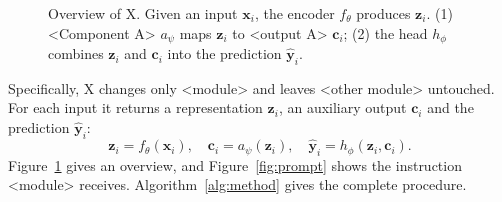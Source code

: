 \begin{figure}[t]
    \centering
    \begin{minipage}{0.9\textwidth}
    \end{minipage}
    \caption{Overview of X. Given an input $\mathbf{x}_{i}$, the encoder $f_\theta$ produces $\mathbf{z}_{i}$. (1) <Component A> $a_\psi$ maps $\mathbf{z}_{i}$ to <output A> $\mathbf{c}_{i}$; (2) the head $h_\phi$ combines $\mathbf{z}_{i}$ and $\mathbf{c}_{i}$ into the prediction $\hat{\mathbf{y}}_{i}$.}
    \label{fig:main-figure}
    \vspace{-6pt}
\end{figure}

Specifically, X changes only <module> and leaves <other module> untouched.
For each input it returns a representation $\mathbf{z}_{i}$, an auxiliary output $\mathbf{c}_{i}$ and the prediction $\hat{\mathbf{y}}_{i}$:
\begin{equation}
\mathbf{z}_{i} = f_\theta(\mathbf{x}_{i}), \quad \mathbf{c}_{i} = a_\psi(\mathbf{z}_{i}), \quad \hat{\mathbf{y}}_{i} = h_\phi(\mathbf{z}_{i}, \mathbf{c}_{i}).
\end{equation}
Figure~\ref{fig:main-figure} gives an overview, and Figure~\ref{fig:prompt} shows the instruction <module> receives.
Algorithm~\ref{alg:method} gives the complete procedure.

